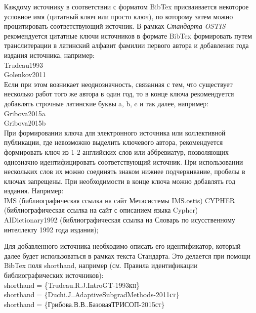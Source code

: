 \begin{SCn}
\begin{scnitemize}
\begin{scnitemizeii}
\begin{scnitemizeiii}
\begin{scnitemizeii}
				\item Каждому источнику в соответствии с форматом BibTex присваивается некоторое условное имя (цитатный ключ или просто ключ), по которому затем можно процитировать соответствующий источник. В рамках \textit{Стандарта OSTIS} рекомендуется цитатные ключи источников в формате BibTex формировать путем транслитерации в латинский алфавит фамилии первого автора и добавления года издания источника, например:\\
				Trudeau1993\\
				Golenkov2011\\
				Если при этом возникает неоднозначность, связанная с тем, что существует несколько работ того же автора в один год, то в конце ключа рекомендуется добавлять строчные латинские буквы a, b, c и так далее, например:\\
				
				Gribova2015a\\
				Gribova2015b\\
				
				При формировании ключа для электронного источника или коллективной публикации, где невозможно выделить ключевого автора, рекомендуется формировать ключ из 1-2 английских слов или аббревиатур, позволяющих однозначно идентифицировать соответствующий источник. При использовании нескольких слов их можно соединять знаком нижнее подчеркивание, пробелы в ключах запрещены. При необходимости в конце ключа можно добавлять год издания. Например:\\
				
				IMS (библиографическая ссылка на сайт Метасистемы IMS.ostis)
				CYPHER (библиографическая ссылка на сайт с описанием языка Cypher)
				AIDictionary1992 (библиографическая ссылка на Словарь по исусственному интеллекту 1992 года издания);
				\item Для добавленного источника необходимо описать его идентификатор, который далее будет использоваться в рамках текста Стандарта. Это делается при помощи BibTex поля shorthand, например (см. Правила идентификации библиографических источников):\\
				
				shorthand = \{Trudeau.R.J.IntroGT-1993кн\}\\
				shorthand = \{Duchi.J..AdaptiveSubgradMethods-2011ст\}\\
				shorthand = \{Грибова.В.В..БазоваяТРИСОП-2015ст\}
				

\end{scnitemizeii}
\end{scnitemizeiii}
\end{scnitemizeii}
\end{scnitemize}
\end{SCn}
